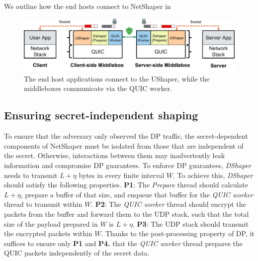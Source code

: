 We outline how the end hosts connect to NetShaper in 

\begin{figure}[!htb]
    \centering
    \includegraphics[width=\columnwidth]{figures/netshaper/netshaper-schematic.png}
    \caption{The end host applications connect to the UShaper, while the middleboxes communicate via the QUIC worker.}
    \label{fig:netshaper-schematic}
\end{figure}


\subsection{Ensuring secret-independent shaping}
\label{subsec:netshaper-secret-independent-shaping-implementation}

To ensure that the adversary only observed the DP traffic, the secret-dependent components of NetShaper must be isolated from those that are independent of the secret. 
Otherwise, interactions between them may inadvertently leak information and compromise DP guarantees.
To enforce DP guarantees, \textit{DShaper} needs to transmit $L + \eta$ bytes in every finite interval $W$.
To achieve this, \textit{DShaper} should satisfy the following properties.
\textbf{P1}: The \textit{Prepare} thread should calculate $L + \eta$, prepare a buffer of that size, and enqueue that buffer for the \textit{QUIC worker} thread to transmit within $W$.
\textbf{P2}: The \textit{QUIC worker} thread should encrypt the packets from the buffer and forward them to the UDP stack, such that the total size of the payload prepared in $W$ is $L + \eta$.
\textbf{P3}: The UDP stack should transmit the encrypted packets within $W$.
Thanks to the post-processing property of DP, it suffices to ensure only \textbf{P1} and \textbf{P4.} that the \textit{QUIC worker} thread prepares the QUIC packets independently of the secret data.

